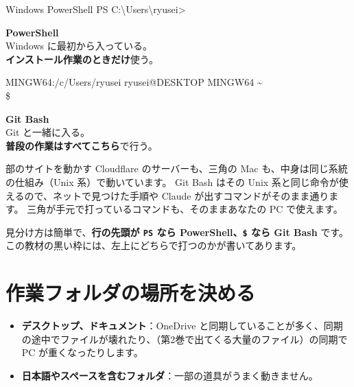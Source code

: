 \begin{center}
\begin{minipage}[t]{0.48\linewidth}
\begin{wintermwin}[\linewidth]{Windows PowerShell}
PS C:\textbackslash Users\textbackslash ryusei>
\end{wintermwin}
\centering\small\textbf{PowerShell}\\Windows に最初から入っている。\\\textbf{インストール作業のときだけ}使う。
\end{minipage}\hfill
\begin{minipage}[t]{0.48\linewidth}
\begin{wintermwin}[\linewidth]{MINGW64:/c/Users/ryusei}
{\color{matcha!70!white}ryusei@DESKTOP} {\color{violet!50!white}MINGW64} {\color{kincha!80!white}\textasciitilde}\\
\$
\end{wintermwin}
\centering\small\textbf{Git Bash}\\Git と一緒に入る。\\\textbf{普段の作業はすべてこちら}で行う。
\end{minipage}
\end{center}

\begin{why}
部のサイトを動かす Cloudflare のサーバーも、三角の Mac も、中身は同じ系統の仕組み（Unix 系）で動いています。
Git Bash はその Unix 系と同じ命令が使えるので、ネットで見つけた手順や Claude が出すコマンドがそのまま通ります。
三角が手元で打っているコマンドも、そのままあなたの PC で使えます。
\end{why}

見分け方は簡単で、\textbf{行の先頭が \texttt{PS} なら PowerShell、\texttt{\$} なら Git Bash} です。
この教材の黒い枠には、左上にどちらで打つのかが書いてあります。

\section{作業フォルダの場所を決める}

\begin{caution}[作業フォルダを置いてはいけない場所]
\begin{itemize}
  \item \textbf{デスクトップ、ドキュメント}：OneDrive と同期していることが多く、同期の途中でファイルが壊れたり、（第2巻で出てくる大量のファイル）の同期で PC が重くなったりします。
  \item \textbf{日本語やスペースを含むフォルダ}：一部の道具がうまく動きません。
\end{itemize}
\end{caution}

